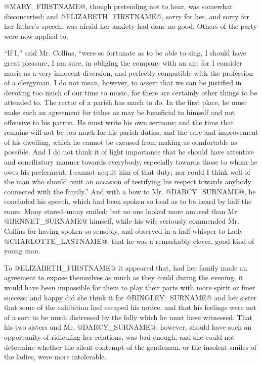 @MARY_FIRSTNAME@, though pretending not to hear, was somewhat disconcerted; and
@ELIZABETH_FIRSTNAME@, sorry for her, and sorry for her father's speech, was afraid
her anxiety had done no good. Others of the party were now applied to.

``If I,'' said Mr. Collins, ``were so fortunate as to be able to sing, I
should have great pleasure, I am sure, in obliging the company with an
air; for I consider music as a very innocent diversion, and perfectly
compatible with the profession of a clergyman. I do not mean, however,
to assert that we can be justified in devoting too much of our time
to music, for there are certainly other things to be attended to. The
rector of a parish has much to do. In the first place, he must make
such an agreement for tithes as may be beneficial to himself and not
offensive to his patron. He must write his own sermons; and the time
that remains will not be too much for his parish duties, and the care
and improvement of his dwelling, which he cannot be excused from making
as comfortable as possible. And I do not think it of light importance
that he should have attentive and conciliatory manner towards everybody,
especially towards those to whom he owes his preferment. I cannot acquit
him of that duty; nor could I think well of the man who should omit an
occasion of testifying his respect towards anybody connected with the
family.'' And with a bow to Mr. @DARCY_SURNAME@, he concluded his speech, which had
been spoken so loud as to be heard by half the room. Many stared--many
smiled; but no one looked more amused than Mr. @BENNET_SURNAME@ himself, while his
wife seriously commended Mr. Collins for having spoken so sensibly,
and observed in a half-whisper to Lady @CHARLOTTE_LASTNAME@, that he was a remarkably
clever, good kind of young man.

To @ELIZABETH_FIRSTNAME@ it appeared that, had her family made an agreement to
expose themselves as much as they could during the evening, it would
have been impossible for them to play their parts with more spirit or
finer success; and happy did she think it for @BINGLEY_SURNAME@ and her sister
that some of the exhibition had escaped his notice, and that his
feelings were not of a sort to be much distressed by the folly which he
must have witnessed. That his two sisters and Mr. @DARCY_SURNAME@, however, should
have such an opportunity of ridiculing her relations, was bad enough,
and she could not determine whether the silent contempt of the
gentleman, or the insolent smiles of the ladies, were more intolerable.

